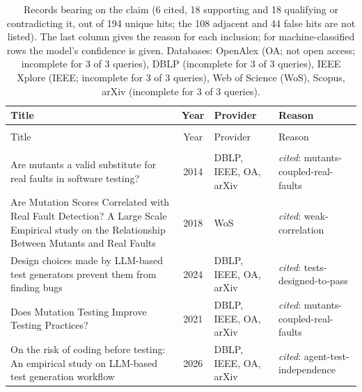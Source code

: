 
\begingroup\footnotesize
\begin{longtable}{@{}%
  >{\raggedright\arraybackslash}p{}c%
  >{\raggedright\arraybackslash}p{}%
  >{\raggedright\arraybackslash}p{}@{}}
\caption{Records bearing on the claim (6 cited, 18 supporting and 18 qualifying or contradicting it, out of 194 unique hits; the 108 adjacent and 44 false hits are not listed). The last column gives the reason for each inclusion; for machine-classified rows the model's confidence is given. Databases: OpenAlex (OA; not open access; incomplete for 3 of 3 queries), DBLP (incomplete for 3 of 3 queries), IEEE Xplore (IEEE; incomplete for 3 of 3 queries), Web of Science (WoS), Scopus, arXiv (incomplete for 3 of 3 queries).}\label{tab:t-mutation}\\
\toprule
Title & Year & Provider & Reason \\
\midrule
\endfirsthead
\multicolumn{4}{@{}l}{\emph{\tablename~\thetable{} (cont.)}}\\
\toprule
Title & Year & Provider & Reason \\
\midrule
\endhead
\midrule \multicolumn{4}{r@{}}{\emph{continued on next page}}\\
\endfoot
\bottomrule
\endlastfoot
Are mutants a valid substitute for real faults in software testing? & 2014 & DBLP, IEEE, OA, arXiv & \emph{cited}: mutants-coupled-real-faults \\
Are Mutation Scores Correlated with Real Fault Detection? A Large Scale Empirical study on the Relationship Between Mutants and Real Faults & 2018 & WoS & \emph{cited}: weak-correlation \\
Design choices made by LLM-based test generators prevent them from finding bugs & 2024 & DBLP, IEEE, OA, arXiv & \emph{cited}: tests-designed-to-pass \\
Does Mutation Testing Improve Testing Practices? & 2021 & DBLP, IEEE, OA, arXiv & \emph{cited}: mutants-coupled-real-faults \\
On the risk of coding before testing: An empirical study on LLM-based test generation workflow & 2026 & DBLP, IEEE, OA, arXiv & \emph{cited}: agent-test-independence \\

\end{longtable}
